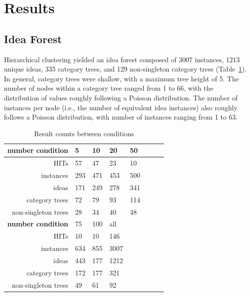 \section{Results}

\subsection{Idea Forest}

Hierarchical clustering yielded an idea forest composed of 3007 instances, 1213 unique ideas, 335 category trees, and 129 non-singleton category trees (Table~\ref{tab:idea_forest}). In general, category trees were shallow, with a maximum tree height of 5. The number of nodes within a category tree ranged from 1 to 66, with the distribution of values roughly following a Poisson distribution. The number of instances per node (i.e., the number of equivalent idea instances) also roughly follows a Poisson distribution, with number of instances ranging from 1 to 63.
\begin{table}
	\begin{tabular}[h!]{r | l l l l l l l}
	\textbf{number condition} & 5 & 10 & 20 & 50 \\ \hline \hline
	HITs & 57 & 47 & 23 & 10\\
	instances & 293 & 471 & 453 & 500 \\
	ideas & 171 & 249 & 278 & 341 \\
	category trees & 72 & 79 & 93 & 114 \\
	non-singleton trees & 28 & 34 & 40 & 48 \\ \hline \hline
	\textbf{number condition} & 75 & 100 & all \\ \hline \hline
    HITs & 10 & 10 & 146\\
	instances & 634 & 855 & 3007\\
	ideas & 443 & 177 &1212\\
	category trees & 172 & 177 &321\\
	non-singleton trees & 49 & 61 &92\\ 
	\end{tabular}
    \caption{Result counts between conditions}
    \label{tab:idea_forest}
\end{table}


